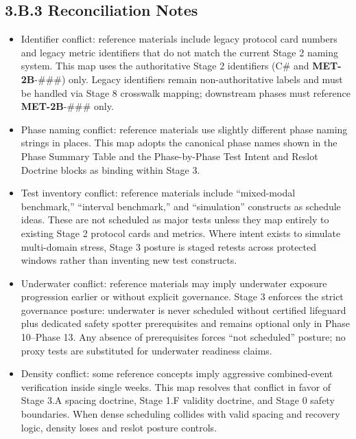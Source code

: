 \documentclass[10pt]{article}
\begin{document}
\subsection*{3.B.3 Reconciliation Notes}
{}

\begin{itemize}
\item Identifier conflict: reference materials include legacy protocol card numbers and legacy metric identifiers that do not match the current Stage 2 naming system. This map uses the authoritative Stage 2 identifiers (C# and \textbf{MET-2B}-###) only. Legacy identifiers remain non-authoritative labels and must be handled via Stage 8 crosswalk mapping; downstream phases must reference \textbf{MET-2B}-### only.

\item Phase naming conflict: reference materials use slightly different phase naming strings in places. This map adopts the canonical phase names shown in the Phase Summary Table and the Phase-by-Phase Test Intent and Reslot Doctrine blocks as binding within Stage 3.

\item Test inventory conflict: reference materials include “mixed-modal benchmark,” “interval benchmark,” and “simulation” constructs as schedule ideas. These are not scheduled as major tests unless they map entirely to existing Stage 2 protocol cards and metrics. Where intent exists to simulate multi-domain stress, Stage 3 posture is staged retests across protected windows rather than inventing new test constructs.

\item Underwater conflict: reference materials may imply underwater exposure progression earlier or without explicit governance. Stage 3 enforces the strict governance posture: underwater is never scheduled without certified lifeguard plus dedicated safety spotter prerequisites and remains optional only in Phase 10–Phase 13. Any absence of prerequisites forces “not scheduled” posture; no proxy tests are substituted for underwater readiness claims.

\item Density conflict: some reference concepts imply aggressive combined-event verification inside single weeks. This map resolves that conflict in favor of Stage 3.A spacing doctrine, Stage 1.F validity doctrine, and Stage 0 safety boundaries. When dense scheduling collides with valid spacing and recovery logic, density loses and reslot posture controls.


\end{itemize}
\end{document}
